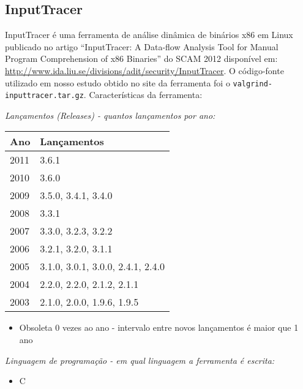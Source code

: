 \subsection{InputTracer}

InputTracer é uma ferramenta de análise dinâmica de binários x86 em Linux
publicado no artigo ``InputTracer: A Data-flow Analysis Tool for Manual
Program Comprehension of x86 Binaries'' do SCAM 2012 disponível em:
\url{http://www.ida.liu.se/divisions/adit/security/InputTracer}. O
código-fonte utilizado em nosso estudo obtido no site da ferramenta foi o
\texttt{valgrind-inputtracer.tar.gz}.  Características da ferramenta:

\begin{description}

  \item {\it Lançamentos ({\it Releases}) - quantos lançamentos por ano:}
    \begin{table}[h!]
      \centering
      \begin{tabular}{| l | l |}
        \hline
        Ano  & Lançamentos                       \\
        \hline
        2011 & 3.6.1                             \\
        2010 & 3.6.0                             \\
        2009 & 3.5.0, 3.4.1, 3.4.0               \\
        2008 & 3.3.1                             \\
        2007 & 3.3.0, 3.2.3, 3.2.2               \\
        2006 & 3.2.1, 3.2.0, 3.1.1               \\
        2005 & 3.1.0, 3.0.1, 3.0.0, 2.4.1, 2.4.0 \\
        2004 & 2.2.0, 2.2.0, 2.1.2, 2.1.1        \\
        2003 & 2.1.0, 2.0.0, 1.9.6, 1.9.5        \\
        \hline
      \end{tabular}
    \end{table}
    \begin{itemize}
      \item Obsoleta $0$ vezes ao ano - intervalo entre novos lançamentos é maior que 1 ano
    \end{itemize}

  \item {\it Linguagem de programação - em qual linguagem a ferramenta é escrita:}
    \begin{itemize}
      \item C
    \end{itemize}

\end{description}

